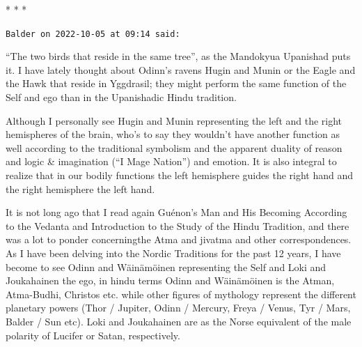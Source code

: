 \bigskip


\begin{center}* * *\end{center}

\begin{footnotesize}\begin{sffamily}

\texttt{Balder on 2022-10-05 at 09:14 said: }

“The two birds that reside in the same tree”, as the Mandokyua Upanishad puts it. I have lately thought about Odinn's ravens Hugin and Munin or the Eagle and the Hawk that reside in Yggdrasil; they might perform the same function of the Self and ego than in the Upanishadic Hindu tradition.

Although I personally see Hugin and Munin representing the left and the right hemispheres of the brain, who's to say they wouldn't have another function as well according to the traditional symbolism and the apparent duality of reason and logic \& imagination (“I Mage Nation”) and emotion. It is also integral to realize that in our bodily functions the left hemisphere guides the right hand and the right hemisphere the left hand.

It is not long ago that I read again Guénon's Man and His Becoming According to the Vedanta and Introduction to the Study of the Hindu Tradition, and there was a lot to ponder concerningthe Atma and jivatma and other correspondences. As I have been delving into the Nordic Traditions for the past 12 years, I have become to see Odinn and Wäinämöinen representing the Self and Loki and Joukahainen the ego, in hindu terms Odinn and Wäinämöinen is the Atman, Atma-Budhi, Christos etc. while other figures of mythology represent the different planetary powers (Thor / Jupiter, Odinn / Mercury, Freya / Venus, Tyr / Mars, Balder / Sun etc). Loki and Joukahainen are as the Norse equivalent of the male polarity of Lucifer or Satan, respectively.

\end{sffamily}\end{footnotesize}